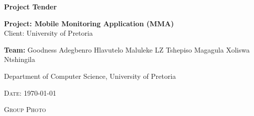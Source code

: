 \begin{titlepage}
	\begin{center}
		
		\textbf{\huge Project Tender } \\
		\vfill

		\textbf{\large Project: Mobile Monitoring Application (MMA)} \\
		{\large Client: University of Pretoria} \\ 
		
		
		\begin{flushright} \large
			\textbf{Team:}\newline
			Goodness Adegbenro\newline
			Hlavutelo Maluleke\newline
			LZ\newline
			Tshepiso Magagula\newline
			Xoliswa Ntshingila\newline
		\end{flushright}
		{\large Department of Computer Science, University of Pretoria } \\ 
		
	

		\vfill

		

		\textsc{\large Date: \today}	

		\vfill
	
		\textsc{\large Group Photo } \\ 	
		
		
	\end{center}
\end{titlepage}

